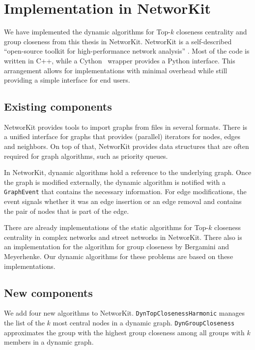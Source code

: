 \chapter{Implementation in NetworKit}
\label{ch:implementation}

We have implemented the dynamic algorithms for Top-$k$ closeness centrality and group closeness from this thesis in NetworKit. NetworKit is a self-described ``open-source toolkit for high-performance network analysis'' \cite{staudt2014networkit}. Most of the code is written in C++, while a Cython~\cite{behnel2010cython} wrapper provides a Python interface. This arrangement allows for implementations with minimal overhead while still providing a simple interface for end users.

\section{Existing components}

NetworKit provides tools to import graphs from files in several formats. There is a unified interface for graphs that provides (parallel) iterators for nodes, edges and neighbors. On top of that, NetworKit provides data structures that are often required for graph algorithms, such as priority queues.

In NetworKit, dynamic algorithms hold a reference to the underlying graph. Once the graph is modified externally, the dynamic algorithm is notified with a \texttt{GraphEvent} that contains the necessary information. For edge modifications, the event signals whether it was an edge insertion or an edge removal and contains the pair of nodes that is part of the edge.

There are already implementations of the static algorithms for Top-$k$ closeness centrality in complex networks and street networks in NetworKit. There also is an implementation for the algorithm for group closeness by Bergamini and Meyerhenke. Our dynamic algorithms for these problems are based on these implementations.

\section{New components}
We add four new algorithms to NetworKit. \texttt{DynTopClosenessHarmonic} manages the list of the $k$ most central nodes in a dynamic graph. \texttt{DynGroupCloseness} approximates the group with the highest group closeness among all groups with $k$ members in a dynamic graph. 

